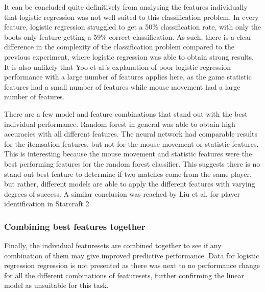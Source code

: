 \documentclass[Report.tex]{subfiles}
\begin{document}
It can be concluded quite definitively from analysing the features individually that logistic regression was not well suited to this classification problem. In every feature, logistic regression struggled to get a 50\% classification rate, with only the boots only feature getting a 59\% correct classification. As such, there is a clear difference in the complexity of the classification problem compared to the previous experiment, where logistic regression was able to obtain strong results. It is also unlikely that Yoo et al.'s explanation of poor logistic regression performance with a large number of features \cite{lr-vs-rf} applies here, as the game statistic features had a small number of features while mouse movement had a large number of features. 

There are a few model and feature combinations that stand out with the best individual performance. Random forest in general was able to obtain high accuracies with all different features. The neural network had comparable results for the itemsation features, but not for the mouse movement or statistic features. This is interesting because the mouse movement and statistic features were the best performing features for the random forest classifier. This suggests there is no stand out best feature to determine if two matches come from the same player, but rather, different models are able to apply the different features with varying degrees of success. A similar conclusion was reached by Liu et al. \cite{starcraft-identification} for player identification in Starcraft 2. 

\subsubsection{Combining best features together}
Finally, the individual featuresets are combined together to see if any combination of them may give improved predictive performance. Data for logistic regression regression is not presented as there was next to no performance change for all the different combinations of featuresets, further confirming the linear model as unsuitable for this task. 
\end{document}
